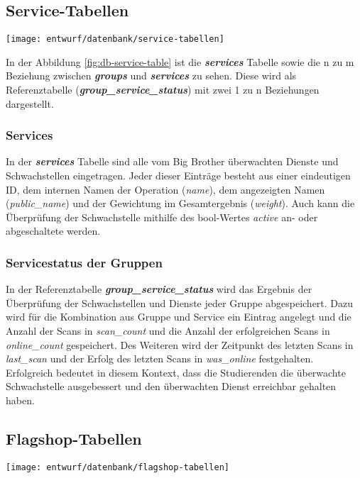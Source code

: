 \subsection{Service-Tabellen}
\begin{center}
	\texttt{[image: entwurf/datenbank/service-tabellen]}
	\label{fig:db-service-table}
\end{center}


In der Abbildung \ref{fig:db-service-table} ist die \textbf{\textit{services}} Tabelle sowie die n zu m Beziehung zwischen \textbf{\textit{groups}} und \textbf{\textit{services}} zu sehen. Diese wird als Referenztabelle (\textbf{\textit{group\_service\_status}}) mit zwei 1 zu n Beziehungen dargestellt.

\subsubsection{Services}
In der \textbf{\textit{services}} Tabelle sind alle vom Big Brother überwachten Dienste und Schwachstellen eingetragen. Jeder dieser Einträge besteht aus einer eindeutigen ID, dem internen Namen der Operation (\textit{name}), dem angezeigten Namen (\textit{public\_name}) und der Gewichtung im Gesamtergebnis (\textit{weight}). Auch kann die Überprüfung der Schwachstelle mithilfe des bool-Wertes \textit{active} an- oder abgeschaltete werden.

\subsubsection{Servicestatus der Gruppen}
In der Referenztabelle \textbf{\textit{group\_service\_status}} wird das Ergebnis der Überprüfung der Schwachstellen und Dienste jeder Gruppe abgespeichert. Dazu wird für die Kombination aus Gruppe und Service ein Eintrag angelegt und die Anzahl der Scans in \textit{scan\_count} und die Anzahl der erfolgreichen Scans in \textit{online\_count} gespeichert. Des Weiteren wird der Zeitpunkt des letzten Scans in \textit{last\_scan} und der Erfolg des letzten Scans in \textit{was\_online} festgehalten. Erfolgreich bedeutet in diesem Kontext, dass die Studierenden die überwachte Schwachstelle ausgebessert und den überwachten Dienst erreichbar gehalten haben.

\subsection{Flagshop-Tabellen}
\begin{center}
	\texttt{[image: entwurf/datenbank/flagshop-tabellen]}
	\label{fig:db-flagshop-table}
\end{center}

